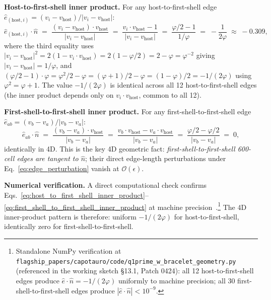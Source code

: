 \documentclass[11pt,letterpaper]{article}
\newcommand{\phig}{\varphi}
\begin{document}
\textbf{Host-to-first-shell inner product.} For any host-to-first-shell edge $\hat{e}_{(\text{host},i)} = (v_i - v_{\text{host}})/|v_i - v_{\text{host}}|$:
\begin{equation}\label{eq:host_to_first_shell_inner_product}
\hat{e}_{(\text{host},i)} \cdot \hat{n} \;=\; \frac{(v_i - v_{\text{host}}) \cdot v_{\text{host}}}{|v_i - v_{\text{host}}|} \;=\; \frac{v_i \cdot v_{\text{host}} - 1}{|v_i - v_{\text{host}}|} \;=\; \frac{\phig/2 - 1}{1/\phig} \;=\; -\frac{1}{2\phig} \;\approx\; -0.309,
\end{equation}
where the third equality uses $|v_i - v_{\text{host}}|^2 = 2(1 - v_i \cdot v_{\text{host}}) = 2(1 - \phig/2) = 2 - \phig = \phig^{-2}$ giving $|v_i - v_{\text{host}}| = 1/\phig$, and $(\phig/2 - 1) \cdot \phig = \phig^2/2 - \phig = (\phig + 1)/2 - \phig = (1 - \phig)/2 = -1/(2\phig)$ using $\phig^2 = \phig + 1$. The value $-1/(2\phig)$ is identical across all 12 host-to-first-shell edges (the inner product depends only on $v_i \cdot v_{\text{host}}$, common to all 12).

\textbf{First-shell-to-first-shell inner product.} For any first-shell-to-first-shell edge $\hat{e}_{ab} = (v_b - v_a)/|v_b - v_a|$:
\begin{equation}\label{eq:first_shell_to_first_shell_inner_product}
\hat{e}_{ab} \cdot \hat{n} \;=\; \frac{(v_b - v_a) \cdot v_{\text{host}}}{|v_b - v_a|} \;=\; \frac{v_b \cdot v_{\text{host}} - v_a \cdot v_{\text{host}}}{|v_b - v_a|} \;=\; \frac{\phig/2 - \phig/2}{|v_b - v_a|} \;=\; 0,
\end{equation}
identically in 4D. This is the key 4D geometric fact: \emph{first-shell-to-first-shell 600-cell edges are tangent to $\hat{n}$}; their direct edge-length perturbations under Eq.~\eqref{eq:edge_perturbation} vanish at $\mathcal{O}(\epsilon)$.

\textbf{Numerical verification.} A direct computational check confirms Eqs.~\eqref{eq:host_to_first_shell_inner_product}--\eqref{eq:first_shell_to_first_shell_inner_product} at machine precision~\cite{abshier_capotauro_chiral_mechanism_sketch}.\footnote{Standalone NumPy verification at \texttt{flagship\_papers/capotauro/code/q1prime\_w\_bracelet\_geometry.py} (referenced in the working sketch \S13.1, Patch 0424): all 12 host-to-first-shell edges produce $\hat{e} \cdot \hat{n} = -1/(2\phig)$ uniformly to machine precision; all 30 first-shell-to-first-shell edges produce $|\hat{e} \cdot \hat{n}| < 10^{-9}$.} The 4D inner-product pattern is therefore: uniform $-1/(2\phig)$ for host-to-first-shell, identically zero for first-shell-to-first-shell.
\end{document}
